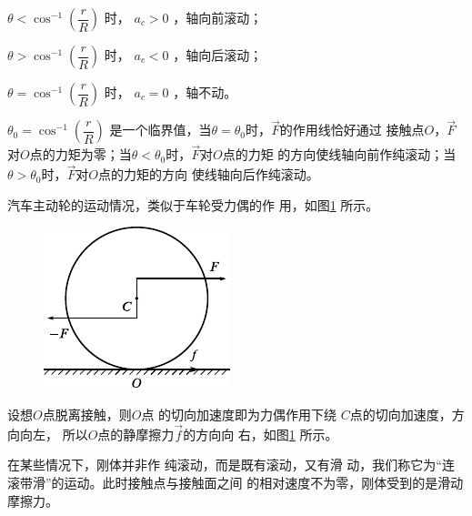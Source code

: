 $ \theta < \cos ^ { - 1 } \left( \dfrac { r } { R } \right) $ 时， $ a _ { c } > 0 $  ，轴向前滚动；

$ \theta > \cos ^ { - 1 } \left( \dfrac { r } { R } \right) $
时， $ a _ { c } < 0 $  ，轴向后滚动；

$ \theta = \cos ^ { - 1 } \left( \dfrac { r } { R } \right) $
时， $ a _ { c } = 0 $  ，轴不动。

$ \theta _ { 0 } = \cos ^ { - 1 } \left( \dfrac { r } { R } \right) $
是一个临界值，当$ \theta = \theta_{ 0 } $时，$ \vec{F} $的作用线恰好通过
接触点$ O $，$\vec{F}$对$ O $点的力矩为零；当$ \theta < \theta_{ 0 } $时，$ \vec{F} $对$ O $点的力矩
的方向使线轴向前作纯滚动；当$  \theta > \theta _ { 0 }   $时，$\vec{F}$对$ O $点的力矩的方向
使线轴向后作纯滚动。

\clearpage
\example 汽车主动轮的运动情况，类似于车轮受力偶的作
用，如图\ref{fig:10.20} 所示。

\begin{figure}
    \vspace{-1.56em}
    \centering
    \includegraphics{figure/fig10.20}
    \caption{}
    \label{fig:10.20}
\end{figure}
设想$ O $点脱离接触，则$ O $点
的切向加速度即为力偶作用下绕
$ C $点的切向加速度，方向向左，
所以$ O $点的静摩擦力$\vec{f}$的方向向
右，如图\ref{fig:10.20} 所示。

在某些情况下，刚体并非作
纯滚动，而是既有滚动，又有滑
动，我们称它为“连滚带滑”的运动。此时接触点与接触面之间
的相对速度不为零，刚体受到的是滑动摩擦力。

